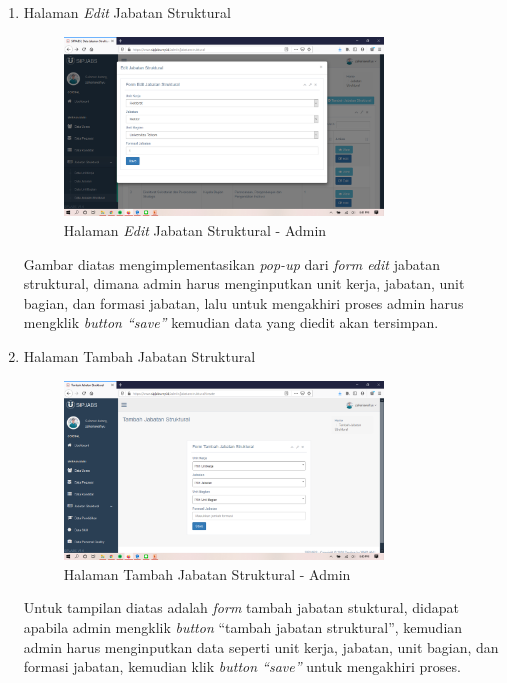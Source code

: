 \begin{enumerate}
	\item Halaman \textit{Edit} Jabatan Struktural
	\begin{figure}
		\centering
		\includegraphics[width=0.8\textwidth]
		{pics/admin/implementasi/editjabstruk.png}
		\caption{Halaman \textit{Edit} Jabatan Struktural - Admin}
		\label{fig:CC10}
	\end{figure}
	Gambar diatas mengimplementasikan \textit{pop-up} dari \textit{form edit} jabatan struktural, dimana admin harus menginputkan unit kerja, jabatan, unit bagian, dan formasi jabatan, lalu untuk mengakhiri proses admin harus mengklik \textit{button “save”} kemudian data yang diedit akan tersimpan. 
	
	\item Halaman Tambah Jabatan Struktural
	\begin{figure}
		\centering
		\includegraphics[width=0.8\textwidth]
		{pics/admin/implementasi/tambahjabstruk.png}
		\caption{Halaman Tambah Jabatan Struktural - Admin}
		\label{fig:CC10}
	\end{figure}
	Untuk tampilan diatas adalah \textit{form} tambah jabatan stuktural, didapat apabila admin mengklik \textit{button} “tambah jabatan struktural”, kemudian admin harus menginputkan data seperti unit kerja, jabatan, unit bagian, dan formasi jabatan, kemudian klik \textit{button “save”} untuk mengakhiri proses.
	

\end{enumerate}
